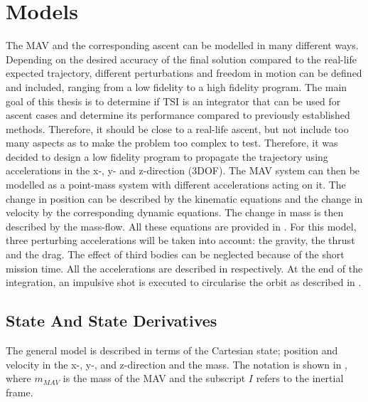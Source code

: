 

\chapter{Models} 
\label{ch:models}
The \ac{MAV} and the corresponding ascent can be modelled in many different ways. Depending on the desired accuracy of the final solution compared to the real-life expected trajectory, different perturbations and freedom in motion can be defined and included, ranging from a low fidelity to a high fidelity program. The main goal of this thesis is to determine if \ac{TSI} is an integrator that can be used for ascent cases and determine its performance compared to previously established methods. Therefore, it should be close to a real-life ascent, but not include too many aspects as to make the problem too complex to test. Therefore, it was decided to design a low fidelity program to propagate the trajectory using accelerations in the x-, y- and z-direction (3DOF). The \ac{MAV} system can then be modelled as a point-mass system with different accelerations acting on it. The change in position can be described by the kinematic equations and the change in velocity by the corresponding dynamic equations. The change in mass is then described by the mass-flow. All these equations are provided in . For this model, three perturbing accelerations will be taken into account: the gravity, the thrust and the drag. The effect of third bodies can be neglected because of the short mission time. All the accelerations are described in  respectively. At the end of the integration, an impulsive shot is executed to circularise the orbit as described in .

\section{State And State Derivatives}
\label{sec:stateAndStateDerivatives}
The general model is described in terms of the Cartesian state; position and velocity in the x-, y-, and z-direction and the mass. The notation is shown in , where $m_{MAV}$ is the mass of the \ac{MAV} and the subscript $I$ refers to the inertial frame.

